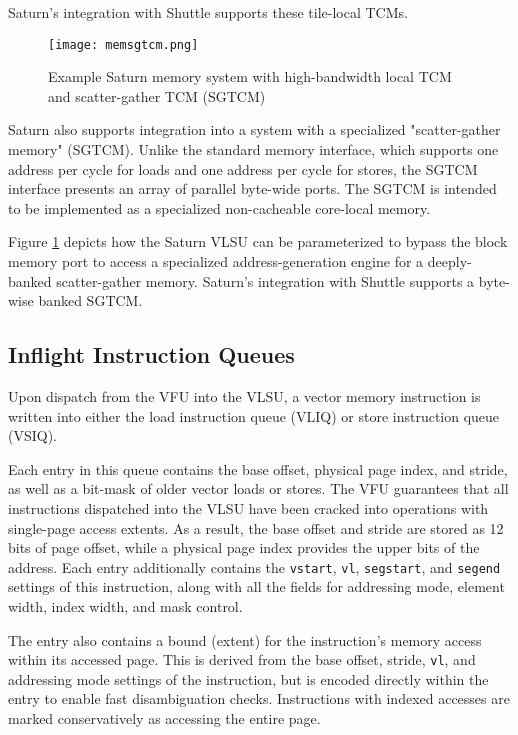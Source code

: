 Saturn's integration with Shuttle supports these tile-local TCMs.

\begin{figure}[h]
  \centering
  \texttt{[image: memsgtcm.png]}
  \caption{Example Saturn memory system with high-bandwidth local TCM and scatter-gather TCM (SGTCM)}
  \label{fig:mem-sgtcm}
\end{figure}

Saturn also supports integration into a system with a specialized "scatter-gather memory" (SGTCM).
Unlike the standard memory interface, which supports one address per cycle for loads and one address per cycle for stores, the SGTCM interface presents an array of parallel byte-wide ports.
The SGTCM is intended to be implemented as a specialized non-cacheable core-local memory.

Figure \ref{fig:mem-sgtcm} depicts how the Saturn VLSU can be parameterized to bypass the block memory port to access a specialized address-generation engine for a deeply-banked scatter-gather memory.
Saturn's integration with Shuttle supports a byte-wise banked SGTCM.

\subsection{Inflight Instruction Queues}
Upon dispatch from the VFU into the VLSU, a vector memory instruction is written into either the load instruction queue (VLIQ) or store instruction queue (VSIQ).

Each entry in this queue contains the base offset, physical page index, and stride, as well as a bit-mask of older vector loads or stores.
The VFU guarantees that all instructions dispatched into the VLSU have been cracked into operations with single-page access extents.
As a result, the base offset and stride are stored as 12 bits of page offset, while a physical page index provides the upper bits of the address.
Each entry additionally contains the \texttt{vstart}, \texttt{vl}, \texttt{segstart}, and \texttt{segend} settings of this instruction, along with all the fields for addressing mode, element width, index width, and mask control.

The entry also contains a bound (extent) for the instruction's memory access within its accessed page.
This is derived from the base offset, stride, \texttt{vl}, and addressing mode settings of the instruction, but is encoded directly within the entry to enable fast disambiguation checks.
Instructions with indexed accesses are marked conservatively as accessing the entire page.

